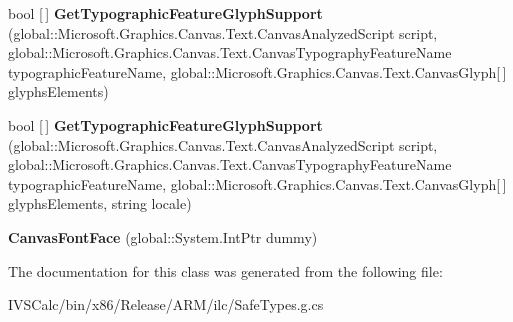 \begin{DoxyCompactItemize}
bool \mbox{[}$\,$\mbox{]} {\bfseries Get\+Typographic\+Feature\+Glyph\+Support} (global\+::\+Microsoft.\+Graphics.\+Canvas.\+Text.\+Canvas\+Analyzed\+Script script, global\+::\+Microsoft.\+Graphics.\+Canvas.\+Text.\+Canvas\+Typography\+Feature\+Name typographic\+Feature\+Name, global\+::\+Microsoft.\+Graphics.\+Canvas.\+Text.\+Canvas\+Glyph\mbox{[}$\,$\mbox{]} glyphs\+Elements)
\item 
\mbox{\label{class_microsoft_1_1_graphics_1_1_canvas_1_1_text_1_1_canvas_font_face_ae0d5c7ee944b1f25cd4fb4678a0b2f3f}} 
bool \mbox{[}$\,$\mbox{]} {\bfseries Get\+Typographic\+Feature\+Glyph\+Support} (global\+::\+Microsoft.\+Graphics.\+Canvas.\+Text.\+Canvas\+Analyzed\+Script script, global\+::\+Microsoft.\+Graphics.\+Canvas.\+Text.\+Canvas\+Typography\+Feature\+Name typographic\+Feature\+Name, global\+::\+Microsoft.\+Graphics.\+Canvas.\+Text.\+Canvas\+Glyph\mbox{[}$\,$\mbox{]} glyphs\+Elements, string locale)
\item 
\mbox{\label{class_microsoft_1_1_graphics_1_1_canvas_1_1_text_1_1_canvas_font_face_aef189d914adb999be992b177e5789e32}} 
{\bfseries Canvas\+Font\+Face} (global\+::\+System.\+Int\+Ptr dummy)
\end{DoxyCompactItemize}


The documentation for this class was generated from the following file\+:\begin{DoxyCompactItemize}
\item 
I\+V\+S\+Calc/bin/x86/\+Release/\+A\+R\+M/ilc/Safe\+Types.\+g.\+cs\end{DoxyCompactItemize}
